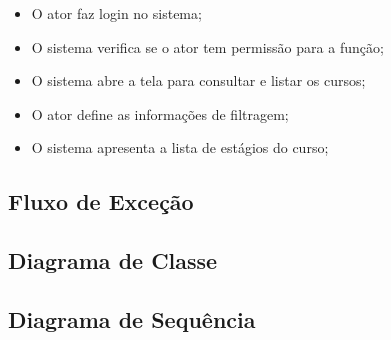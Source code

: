 \begin{itemize}
  \item O ator faz login no sistema;
  \item O sistema verifica se o ator tem permissão para a função;
  \item O sistema abre a tela para consultar e listar os cursos;
  \item O ator define as informações de filtragem;
  \item O sistema apresenta a lista de estágios do curso; 
\end{itemize}

\subsection{Fluxo de Exceção}

\subsection{Diagrama de Classe}

\subsection{Diagrama de Sequência}